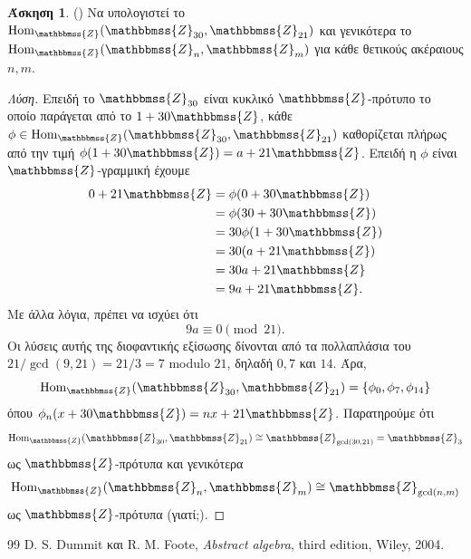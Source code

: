\documentclass[12pt,a4paper,reqno]{amsart}
\theoremstyle{definition}
\newtheorem{exercise}{Άσκηση}
\newcommand{\ZZ}{\mathbbmss{Z}}
\newcommand{\Hom}{\mathrm{Hom}}
\begin{document}
\begin{exercise}{\rm(\cite[Ασκήσεις~10.2.5~και~10.2.6]{DF04})}
  \label{ex:DF_10.2.5-10.2.6}
  Να υπολογιστεί το $\Hom_\ZZ(\ZZ_{30},\ZZ_{21})$ και γενι\-κότερα το $\Hom_{\ZZ}(\ZZ_n, \ZZ_m)$ για κάθε θετικούς ακέραιους $n, m$.
\end{exercise}

\begin{proof}[Λύση]
  Επειδή το $\ZZ_{30}$ είναι κυκλικό $\ZZ$-πρότυπο το οποίο παράγεται από το $1 + 30\ZZ$, κάθε $\phi \in \Hom_{\ZZ}(\ZZ_{30},\ZZ_{21})$ καθορίζεται πλήρως από την τιμή $\phi(1 + 30\ZZ) = a + 21\ZZ$. Επειδή η $\phi$ είναι $\ZZ$-γραμμική έχουμε 
  \begin{align*}
  0 + 21\ZZ &= \phi(0 + 30\ZZ) \\
  &= \phi(30 + 30\ZZ) \\
  &= 30\phi(1 + 30\ZZ) \\
  &= 30(a + 21\ZZ) \\
  &= 30a + 21\ZZ \\
  &= 9a + 21\ZZ.
  \end{align*}
  Με άλλα λόγια, πρέπει να ισχύει ότι 
  \[
  9a \equiv 0 \pmod{21}.
  \]
  Οι λύσεις αυτής της διοφαντικής εξίσωσης δίνονται από τα πολλαπλάσια του $21/\gcd(9,21) = 21/3 = 7$ modulo $21$, δηλαδή $0, 7$ και $14$. Άρα,
  \[
  \Hom_{\ZZ}(\ZZ_{30},\ZZ_{21}) = \{\phi_0, \phi_7, \phi_{14}\}
  \]
  όπου $\phi_n(x + 30\ZZ) = nx + 21\ZZ$. Παρατηρούμε ότι 
  \[
  \Hom_{\ZZ}(\ZZ_{30},\ZZ_{21}) \cong \ZZ_{\gcd(30,21)} = \ZZ_3
  \]
  ως $\ZZ$-πρότυπα και γενικότερα 
  \[
  \Hom_{\ZZ}(\ZZ_n, \ZZ_m) \cong \ZZ_{\gcd(n,m)}
  \]
  ως $\ZZ$-πρότυπα (γιατί;).
\end{proof}

\begin{thebibliography}{99}
    D. S. Dummit και R. M. Foote, 
    \textit{Abstract algebra},
    third edition, Wiley, 2004. 
\end{thebibliography}
\end{document}
